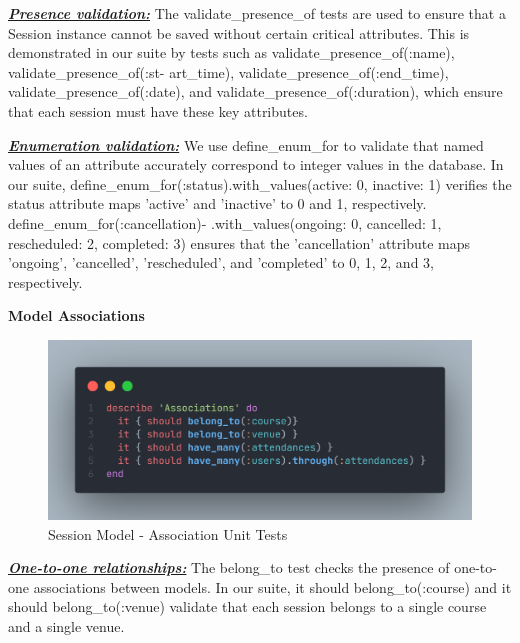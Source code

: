 \begin{justify}
\vspace{0.25cm}
\noindent\textbf{\textit{\underline{Presence validation:}}} The validate\_presence\_of tests are used to ensure that a Session instance cannot be saved without certain critical attributes. This is demonstrated in our suite by tests such as validate\_presence\_of(:name), validate\_presence\_of(:st- art\_time), validate\_presence\_of(:end\_time), validate\_presence\_of(:date), and validate\_presence\_of(:duration), which ensure that each session must have these key attributes.

\vspace{0.25cm}
\noindent\textbf{\textit{\underline{Enumeration validation:}}} We use define\_enum\_for to validate that named values of an attribute accurately correspond to integer values in the database. In our suite, define\_enum\_for(:status).with\_values(active: 0, inactive: 1) verifies the status attribute maps 'active' and 'inactive' to 0 and 1, respectively. define\_enum\_for(:cancellation)- .with\_values(ongoing: 0, cancelled: 1, rescheduled: 2, completed: 3) ensures that the 'cancellation' attribute maps 'ongoing', 'cancelled', 'rescheduled', and 'completed' to 0, 1, 2, and 3, respectively.

\vspace{0.25cm}
\newendline
\textbf{Model Associations}

    \begin{figure}[H]
        \centerline{\includegraphics[width=140mm,scale=1]{figures/implementation_and_testing/testing/AUT/session/associations.png}}
        \caption{Session Model - Association Unit Tests}
        \label{Session Model - Association Unit Tests}
    \end{figure}

\vspace{0.25cm}
\noindent\textbf{\textit{\underline{One-to-one relationships:}}} The belong\_to test checks the presence of one-to-one associations between models. In our suite, it { should belong\_to(:course)} and it { should belong\_to(:venue) } validate that each session belongs to a single course and a single venue.\\


\end{justify}
